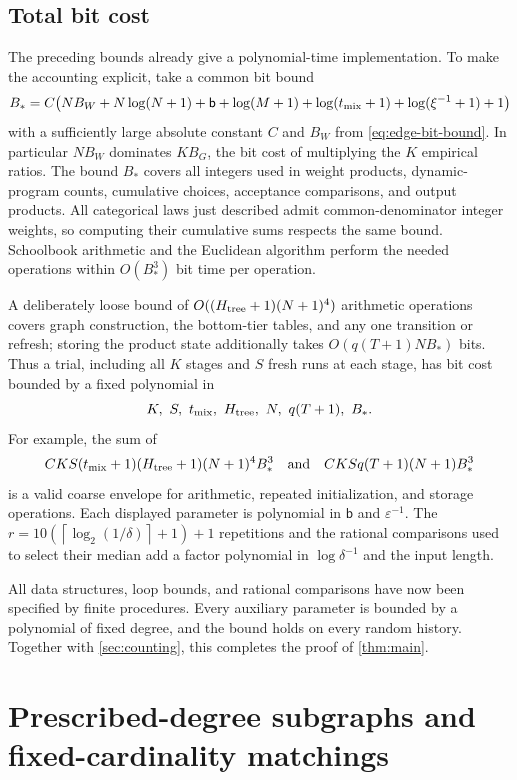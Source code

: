 \documentclass[11pt]{article}
\theoremstyle{definition}
\theoremstyle{remark}
\newcommand{\eps}{\varepsilon}
\newcommand{\ceil}[1]{\left\lceil#1\right\rceil}
\numberwithin{equation}{section}
\begin{document}
\subsection{Total bit cost}
The preceding bounds already give a polynomial-time implementation.
To make the accounting explicit, take a common bit bound
\[
 B_* = C\bigl(NB_W+N\log(N+1)+\mathsf b
                 +\log(M+1)+\log(t_{\rm mix}+1)
                 +\log(\xi^{-1}+1)+1\bigr)
\]
with a sufficiently large absolute constant $C$ and $B_W$ from
\eqref{eq:edge-bit-bound}. In particular $NB_W$ dominates $KB_G$,
the bit cost of multiplying the $K$ empirical ratios.
The bound $B_*$ covers all integers
used in weight products, dynamic-program counts, cumulative choices,
acceptance comparisons, and output products. All categorical laws just
described admit common-denominator integer weights, so computing their
cumulative sums respects the same bound. Schoolbook arithmetic and the
Euclidean algorithm perform the needed operations within $O(B_*^3)$
bit time per operation.

A deliberately loose bound of
$O((H_{\rm tree}+1)(N+1)^4)$ arithmetic operations covers graph
construction, the bottom-tier tables, and any one transition or refresh;
storing the product state additionally takes
$O(q(T+1)N B_*)$ bits. Thus a trial, including all $K$ stages and $S$
fresh runs at each stage, has bit cost bounded by a fixed polynomial
in
\[
 K,\ S,\ t_{\rm mix},\ H_{\rm tree},\ N,\ q(T+1),\ B_*.
\]
For example, the sum of
\[
 CKS(t_{\rm mix}+1)(H_{\rm tree}+1)(N+1)^4B_*^3
 \quad\text{and}\quad
 CKSq(T+1)(N+1)B_*^3
\]
is a valid coarse envelope for arithmetic, repeated initialization,
and storage operations. Each displayed parameter is polynomial in
$\mathsf b$ and $\eps^{-1}$. The
$r=10(\ceil{\log_2(1/\delta)}+1)+1$ repetitions and the rational
comparisons used to select their median add a factor polynomial in
$\log\delta^{-1}$ and the input length.

All data structures, loop bounds, and rational comparisons have now been
specified by finite procedures. Every auxiliary parameter is bounded
by a polynomial of fixed degree, and the bound holds on every random
history. Together with \cref{sec:counting}, this completes the proof
of \cref{thm:main}.
\section{Prescribed-degree subgraphs and fixed-cardinality matchings}
\label{sec:prescribed-degree}
\end{document}

